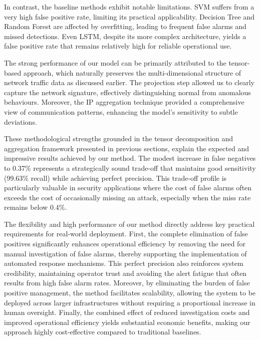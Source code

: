 \documentclass[preprint,12pt,authoryear]{elsarticle}
\begin{document}
In contrast, the baseline methods exhibit notable limitations. SVM suffers from a very high false positive rate, limiting its practical applicability. Decision Tree and Random Forest are affected by overfitting, leading to frequent false alarms and missed detections. Even LSTM, despite its more complex architecture, yields a false positive rate that remains relatively high for reliable operational use.

 The strong performance of our model can be primarily attributed to the tensor-based approach, which naturally preserves the multi-dimensional structure of network traffic data as discussed earlier. The projection step allowed us to clearly capture the network signature, effectively distinguishing normal from anomalous behaviours. Moreover, the IP aggregation technique provided a comprehensive view of communication patterns, enhancing the model’s sensitivity to subtle deviations. 
 
 These methodological strengths grounded in the tensor decomposition and aggregation framework presented in previous sections, explain the expected and impressive results achieved by our method. The modest increase in false negatives to 0.37\% represents a strategically sound trade-off that maintains good sensitivity (99.63\% recall) while achieving perfect precision. This trade-off profile is particularly valuable in security applications where the cost of false alarms often exceeds the cost of occasionally missing an attack, especially when the miss rate remains below 0.4\%.


The flexibility and high performance of our method directly address key practical requirements for real-world deployment. First, the complete elimination of false positives significantly enhances operational efficiency by removing the need for manual investigation of false alarms, thereby supporting the implementation of automated response mechanisms. This perfect precision also reinforces system credibility, maintaining operator trust and avoiding the alert fatigue that often results from high false alarm rates. Moreover, by eliminating the burden of false positive management, the method facilitates scalability, allowing the system to be deployed across larger infrastructures without requiring a proportional increase in human oversight. Finally, the combined effect of reduced investigation costs and improved operational efficiency yields substantial economic benefits, making our approach highly cost-effective compared to traditional baselines.
\end{document}

